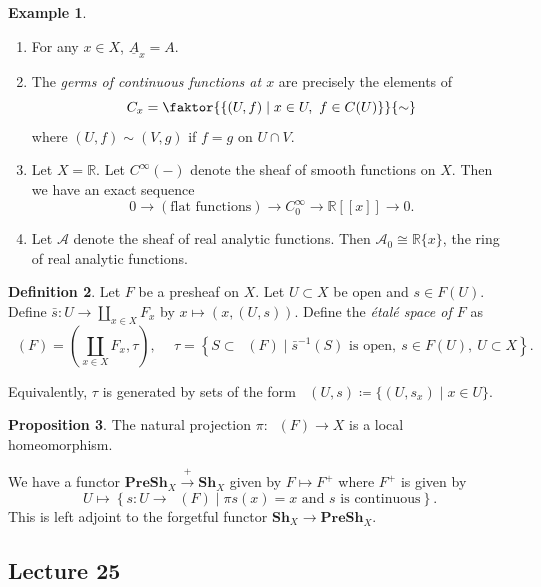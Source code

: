 \documentclass[10pt,letterpaper,cm]{nupset}
\theoremstyle{definition}
\newtheorem{definition}{Definition}[subsection]
\newtheorem{exmp}[definition]{Example}
\theoremstyle{theorem}
\newtheorem{prop}[definition]{Proposition}
\theoremstyle{remark}
\newcommand{\R}{\mathbb{R}}
\newcommand{\1}{\mathbb{1}}
\newcommand{\0}{\vec 0}
\DeclareMathOperator{\Et}{\acute{E}t}
\begin{document}
\begin{exmp} $ $
\begin{enumerate}
\item For any $x \in X$, $\underline{A}_x =A$.
\item The \textit{germs of continuous functions at $x$} are precisely the elements of $$C_x = \faktor{  \left\{(U, f) \mid x\in U, \ f \in C(U)\right\}    }{\sim}$$ where $(U, f) \sim(V, g)$ if $f =g$ on $U \cap V$.
\item Let $X = \R$. Let $C^{\infty}({-})$ denote the sheaf of smooth functions on $X$. Then we have an exact sequence $$ 0 \to \left(\text{flat functions}\right) \to C_0^{\infty} \to \R[\![x]\!] \to 0   .$$
\item Let $\mathcal{A}$ denote the sheaf of real analytic functions. Then $\mathcal{A}_0 \cong \R\{x\}$, the ring of real analytic functions.
\end{enumerate}
\end{exmp}

\begin{definition}
Let $F$ be a presheaf on $X$. Let $U \subset X$ be open and $s \in F(U)$. Define $\bar{s} : U \to  \coprod_{x\in X} F_x$ by $x \mapsto (x, (U, s))$. Define the \textit{\'etal\'e space of $F$} as $$\Et(F)   =  \left(\coprod_{x\in X} F_x, \tau \right), \ \quad \tau =\left\{S \subset \Et(F) \mid \bar{s}^{-1}(S) \text{ is open}, \ s \in F(U), \ U\subset X \right\}.    $$ 
\end{definition}

Equivalently, $\tau$ is generated by sets of the form $\Et(U, s) \coloneqq  \{(U, s_x) \mid x \in U\}$.

\begin{prop}
The natural projection $\pi : \Et(F) \to X$ is a local homeomorphism. 
\end{prop}

\smallskip

We have a functor $\mathbf{PreSh}_X \overset{+}{\longrightarrow} \mathbf{Sh}_{X}$ given by $F \mapsto F^{+}$ where $F^{+}$ is given by $$U \mapsto\left \{s : U \to \Et(F) \mid \pi s(x) = x \text{ and } s \text{ is continuous}\right\}  .$$ This is left adjoint to the forgetful functor $\mathbf{Sh}_{X} \to \mathbf{PreSh}_X$.


\subsection{Lecture 25}
\end{document}

